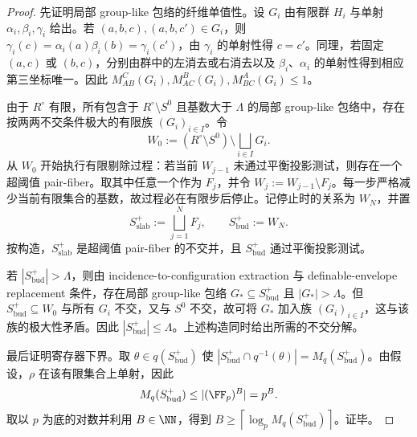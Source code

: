 \begin{proof}
先证明局部 group-like 包络的纤维单值性。设 \(G_i\) 由有限群 \(H_i\) 与单射
\(\alpha_i,\beta_i,\gamma_i\) 给出。若
\((a,b,c),(a,b,c')\in G_i\)，则
\(\gamma_i(c)=\alpha_i(a)\beta_i(b)=\gamma_i(c')\)，由 \(\gamma_i\) 的单射性得 \(c=c'\)。同理，若固定 \((a,c)\) 或 \((b,c)\)，分别由群中的左消去或右消去以及 \(\beta_i\)、\(\alpha_i\) 的单射性得到相应第三坐标唯一。因此
\(M_{AB}^{C}(G_i),M_{AC}^{B}(G_i),M_{BC}^{A}(G_i)\le 1\)。

由于 \(R^\circ\) 有限，所有包含于 \(R^\circ\setminus S^0\) 且基数大于 \(\Lambda\) 的局部 group-like 包络中，存在按两两不交条件极大的有限族 \((G_i)_{i\in I}\)。令
\[
W_0:=(R^\circ\setminus S^0)\setminus\bigsqcup_{i\in I}G_i.
\]
从 \(W_0\) 开始执行有限剔除过程：若当前 \(W_{j-1}\) 未通过平衡投影测试，则存在一个超阈值 pair-fiber。取其中任意一个作为 \(F_j\)，并令 \(W_j:=W_{j-1}\setminus F_j\)。每一步严格减少当前有限集合的基数，故过程必在有限步后停止。记停止时的关系为 \(W_N\)，并置
\[
S_{\mathrm{slab}}^+:=\bigsqcup_{j=1}^{N}F_j,\qquad S_{\mathrm{bud}}^+:=W_N.
\]
按构造，\(S_{\mathrm{slab}}^+\) 是超阈值 pair-fiber 的不交并，且 \(S_{\mathrm{bud}}^+\) 通过平衡投影测试。

若 \(|S_{\mathrm{bud}}^+|>\Lambda\)，则由 incidence-to-configuration extraction 与 definable-envelope replacement 条件，存在局部 group-like 包络
\(G_*\subseteq S_{\mathrm{bud}}^+\) 且 \(|G_*|>\Lambda\)。但
\(S_{\mathrm{bud}}^+\subseteq W_0\) 与所有 \(G_i\) 不交，又与 \(S^0\) 不交，故可将 \(G_*\) 加入族 \((G_i)_{i\in I}\)，这与该族的极大性矛盾。因此
\(|S_{\mathrm{bud}}^+|\le\Lambda\)。上述构造同时给出所需的不交分解。

最后证明寄存器下界。取 \(\theta\in q(S_{\mathrm{bud}}^+)\) 使
\(|S_{\mathrm{bud}}^+\cap q^{-1}(\theta)|=M_q(S_{\mathrm{bud}}^+)\)。由假设，\(\rho\) 在该有限集合上单射，因此
\[
M_q(S_{\mathrm{bud}}^+)\le |(\FF_p)^B|=p^B.
\]
取以 \(p\) 为底的对数并利用 \(B\in\NN\)，得到
\(B\ge\left\lceil\log_p M_q(S_{\mathrm{bud}}^+)\right\rceil\)。证毕。
\end{proof}

